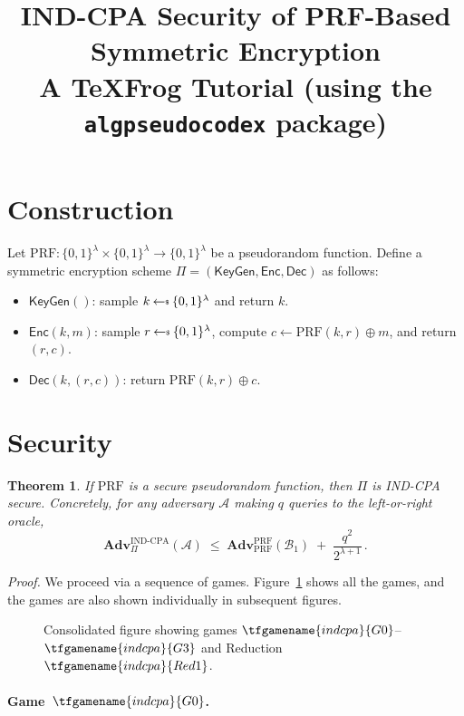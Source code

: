 \documentclass{article}
\title{IND-CPA Security of PRF-Based Symmetric Encryption\\
{\large A TeXFrog Tutorial (using the \texttt{algpseudocodex} package)}}
\author{}
\date{}
\newtheorem{theorem}{Theorem}
\begin{document}
\maketitle

\section{Construction}

Let $\mathrm{PRF}\colon \{0,1\}^\lambda \times \{0,1\}^\lambda \to \{0,1\}^\lambda$
be a pseudorandom function.
Define a symmetric encryption scheme $\Pi = (\mathsf{KeyGen}, \mathsf{Enc}, \mathsf{Dec})$ as follows:
\begin{itemize}
  \item $\mathsf{KeyGen}()$: sample $k \getsr \{0,1\}^\lambda$ and return $k$.
  \item $\mathsf{Enc}(k, m)$: sample $r \getsr \{0,1\}^\lambda$, compute
    $c \gets \mathrm{PRF}(k, r) \oplus m$, and return $(r, c)$.
  \item $\mathsf{Dec}(k, (r, c))$: return $\mathrm{PRF}(k, r) \oplus c$.
\end{itemize}

\section{Security}

\begin{theorem}
If\/ $\mathrm{PRF}$ is a secure pseudorandom function, then $\Pi$ is IND-CPA secure.
Concretely, for any adversary $\mathcal{A}$ making $q$ queries to the
left-or-right oracle,
\[
  \mathbf{Adv}^{\mathrm{IND\text{-}CPA}}_\Pi(\mathcal{A})
  \;\leq\;
  \mathbf{Adv}^{\mathrm{PRF}}_{\mathrm{PRF}}(\mathcal{B}_1)
  \;+\; \frac{q^2}{2^{\lambda+1}} \,.
\]
\end{theorem}

\noindent\textit{Proof.}\quad
We proceed via a sequence of games. Figure~\ref{fig:all-games} shows all the games, and the games are also shown individually in subsequent figures.

\begin{figure}[ht]
\centering
{}
\caption{Consolidated figure showing games $\tfgamename{indcpa}{G0}$--$\tfgamename{indcpa}{G3}$ and Reduction $\tfgamename{indcpa}{Red1}$.}
\label{fig:all-games}
\end{figure}

\paragraph{Game~$\tfgamename{indcpa}{G0}$.}

\end{document}
